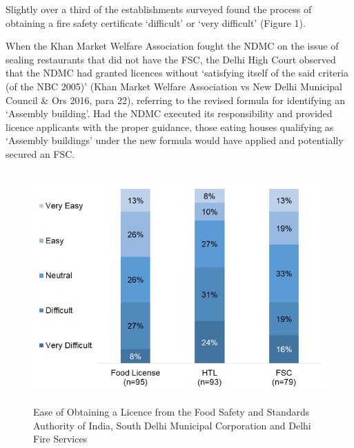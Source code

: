 \documentclass[a4paper, 12pt]{article}
\begin{document}
		Slightly over a third of the establishments surveyed found the process of obtaining a fire safety certificate ‘difficult’ or ‘very difficult’ (Figure 1). 
		
		When the Khan Market Welfare Association fought the NDMC on the issue of sealing restaurants that did not have the FSC, the Delhi High Court observed that the NDMC had granted licences without ‘satisfying itself of the said criteria (of the NBC 
2005)’ (Khan Market Welfare Association vs New Delhi Municipal Council \& Ors 2016, para 22), referring to the revised formula for identifying an ‘Assembly building’. Had the NDMC executed its responsibility and provided licence applicants with the proper 
guidance, those eating houses qualifying as ‘Assembly buildings’ under the new formula would have applied and potentially secured an FSC.%
		\begin{figure}[H]
                    	\centering
                    	\includegraphics[height = 3.5in]{Figure1.png}
                    	\caption[Optional Caption]{Ease of Obtaining a Licence from the Food Safety and Standards Authority of India, South Delhi Municipal Corporation and Delhi Fire Services}
		\end{figure}
                
\end{document}
